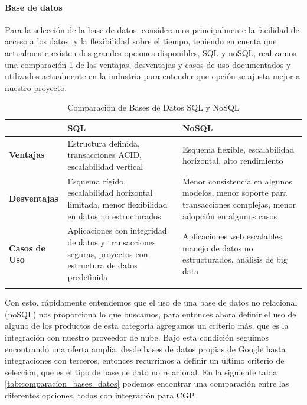 \paragraph{Base de datos}
%
Para la selección de la base de datos, consideramos principalmente la facilidad de acceso a los datos, y la flexibilidad sobre el tiempo, teniendo en cuenta que actualmente existen dos grandes opciones disponibles, SQL y noSQL, realizamos una comparación \ref{tab:comparacion_bd_sql_nosql} de las ventajas, desventajas y casos de uso documentados y utilizados actualmente en la industria para entender que opción se ajusta mejor a nuestro proyecto.\\
%
\begin{longtable}{|m{3cm}|m{5cm}|m{5cm}|}
\hline
\textbf{} & \textbf{SQL} & \textbf{NoSQL} \\
\hline
\textbf{Ventajas} & Estructura definida, transacciones ACID, escalabilidad vertical & Esquema flexible, escalabilidad horizontal, alto rendimiento \\
\hline
\textbf{Desventajas} & Esquema rígido, escalabilidad horizontal limitada, menor flexibilidad en datos no estructurados & Menor consistencia en algunos modelos, menor soporte para transacciones complejas, menor adopción en algunos casos \\
\hline
\textbf{Casos de Uso} & Aplicaciones con integridad de datos y transacciones seguras, proyectos con estructura de datos predefinida & Aplicaciones web escalables, manejo de datos no estructurados, análisis de big data \\
\hline
\caption{Comparación de Bases de Datos SQL y NoSQL \cite{SQLvsNoSQL}}
\label{tab:comparacion_bd_sql_nosql}
\end{longtable}
%
Con esto, rápidamente entendemos que el uso de una base de datos no relacional (noSQL) nos proporciona lo que buscamos, para entonces ahora definir el uso de alguno de los productos de esta categoría agregamos un criterio más, que es la integración con nuestro proveedor de nube.
Bajo esta condición seguimos encontrando una oferta amplia, desde bases de datos propias de Google hasta integraciones con terceros, entonces recurrimos a definir un último criterio de selección, que es el tipo de base de dato no relacional. En la siguiente tabla \ref{tab:comparacion_bases_datos} podemos encontrar una comparación entre las diferentes opciones, todas con integración para CGP.\\
%
